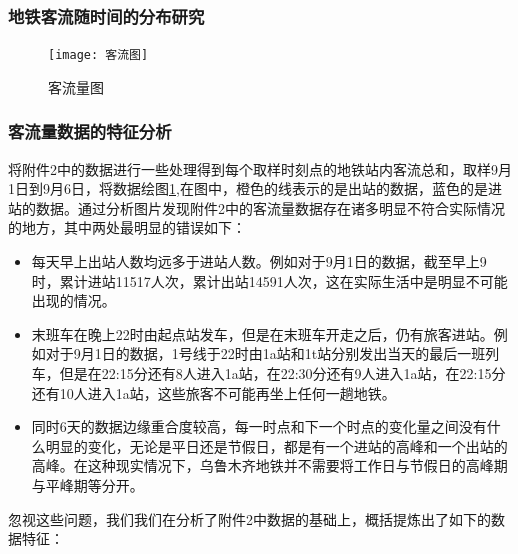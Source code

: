 \documentclass[12pt,a4paper]{mcmthesis}
\begin{document}
    \subsubsection{地铁客流随时间的分布研究}
    \begin{figure}[h!t]
        \centerline{\texttt{[image: 客流图]}\quad
        }
        \caption{\song\wuhao
        客流量图}
        \label{fig:客流量}
    \end{figure}

    \subsubsection{客流量数据的特征分析}

    将附件2中的数据进行一些处理得到每个取样时刻点的地铁站内客流总和，取样9月1日到9月6日，将数据绘图\ref{fig:客流量},在图中，橙色的线表示的是出站的数据，蓝色的是进站的数据。通过分析图片发现附件2中的客流量数据存在诸多明显不符合实际情况的地方，其中两处最明显的错误如下：

    \begin{itemize}
        \item 每天早上出站人数均远多于进站人数。例如对于9月1日的数据，截至早上9时，累计进站11517人次，累计出站14591人次，这在实际生活中是明显不可能出现的情况。
        \item 末班车在晚上22时由起点站发车，但是在末班车开走之后，仍有旅客进站。例如对于9月1日的数据，1号线于22时由1a站和1t站分别发出当天的最后一班列车，但是在22:15分还有8人进入1a站，在22:30分还有9人进入1a站，在22:15分还有10人进入1a站，这些旅客不可能再坐上任何一趟地铁。
        \item 同时6天的数据边缘重合度较高，每一时点和下一个时点的变化量之间没有什么明显的变化，无论是平日还是节假日，都是有一个进站的高峰和一个出站的高峰。在这种现实情况下，乌鲁木齐地铁并不需要将工作日与节假日的高峰期与平峰期等分开。
    \end{itemize}

    忽视这些问题，我们我们在分析了附件2中数据的基础上，概括提炼出了如下的数据特征：
\end{document}
